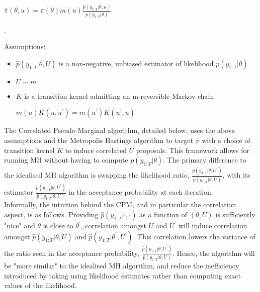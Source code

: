 \documentclass{article}
\begin{document}
\centerline{$\bar{\pi}(\theta, u) = \pi(\theta)m(u)\frac{\hat{p}(y_{1:T}| \theta, u)}{p(y_{1:T}| \theta)}$}.

Assumptions:
\begin{itemize}
 \item $\hat{p}(y_{1:T}| \theta, U)$ is a non-negative, unbiased estimator of likelihood $p(y_{1:T}| \theta)$
 \item $U \sim m$
 \item $K$ is a transition kernel admitting an m-reversible Markov chain \newline
\centerline{$ m(u)K(u,u^\prime) = m(u^\prime)K(u^\prime, u)$} \newline
\end{itemize}



The Correlated Pseudo Marginal algorithm, detailed below, uses the above assumptions and the Metropolis Hastings algorithm to target $\bar{\pi}$ with a choice of transition kernel $K$ to induce correlated $U$ proposals. This framework allows for running MH without having to compute $p(y_{1:T}| \theta)$. The primary difference to the idealised MH algorithm is swapping the likelihood ratio, $\frac{ p(y_{1:T}| \theta, U^\prime)}{ p(y_{1:T}| \theta, U)}$, with its estimator $\frac{ \hat{p}(y_{1:T}| \theta, U^\prime)}{ \hat{p}(y_{1:T}| \theta, U)}$ in the acceptance probability at each iteration. \\

Informally, the intuition behind the CPM, and in particular the correlation aspect, is as follows. Providing $\hat{p}(y_{1:T}| \cdot, \cdot)$ as a function of $(\theta, U)$ is sufficiently "nice" and $\theta$ is close to $\theta^\prime$, correlation amongst $U$ and $U^\prime$ will induce correlation amongst $\hat{p}(y_{1:T}| \theta, U)$ and $\hat{p}(y_{1:T}| \theta^\prime, U^\prime)$. This correlation lowers the variance of the ratio seen in the acceptance probability, $\frac{ \hat{p}(y_{1:T}| \theta, U^\prime)}{ \hat{p}(y_{1:T}| \theta, U)}$. Hence, the algorithm will be "more similar" to the idealised MH algorithm, and reduce the inefficiency introduced by taking using likelihood estimates rather than computing exact values of the likelihood.
\end{document}
